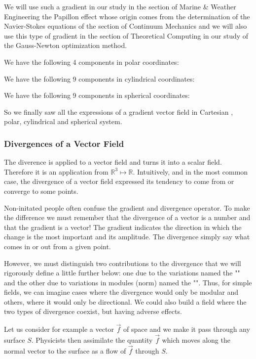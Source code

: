 	 We will use such a gradient in our study in the section of Marine \& Weather Engineering the Papillon effect whose origin comes from the determination of the Navier-Stokes equations of the section of Continuum Mechanics and we will also use this type of gradient in the section of Theoretical Computing in our study of the Gauss-Newton optimization method.
	
	We have the following 4 components in polar coordinates:
	 
	We have the following 9 components in cylindrical coordinates:
	 
	We have the following 9 components in spherical coordinates:
	 
	 So we finally saw all the expressions of a gradient vector field in Cartesian , polar, cylindrical and spherical system.
	 
	\subsubsection{Divergences of a Vector Field}
	The diverence is applied to a vector field and turns it into a scalar field. Therefore it is an application from $\mathbb{R}^3\mapsto \mathbb{R}$. Intuitively, and in the most common case, the divergence of a vector field expressed its tendency to come from or converge to some points.
	\begin{tcolorbox}[title=Remark,colframe=black,arc=10pt]
	Non-initated people often confuse the gradient and divergence operator. To make the difference we must remember that the divergence of a vector is a number and that the gradient is a vector! The gradient indicates the direction in which the change is the most important and its amplitude. The divergence simply say what comes in or out from a given point.
	\end{tcolorbox}	
	However, we must distinguish two contributions to the divergence that we will rigorously define a little further below: one due to the variations named the "" and the other due to variations in modules (norm) named the "". Thus, for simple fields, we can imagine cases where the divergence would only be modular and others, where it would only be directional. We could also build a field where the two types of divergence coexist, but having adverse effects.
	
	Let us consider for example a vector $\vec{f}$ of space and we make it pass through any surface $S$. Physicists then assimilate the quantity $\vec{f}$ which moves along the normal vector to the surface as a flow of $\vec{f}$ through $S$.
	
